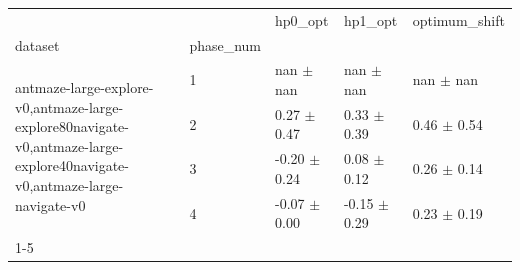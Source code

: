 \begin{tabular}{lllll}
\toprule
 &  & hp0_opt & hp1_opt & optimum_shift \\
dataset & phase_num &  &  &  \\
\midrule
\multirow[t]{4}{*}{antmaze-large-explore-v0,antmaze-large-explore80navigate-v0,antmaze-large-explore40navigate-v0,antmaze-large-navigate-v0} & 1 & nan $\pm$ nan & nan $\pm$ nan & nan $\pm$ nan \\
 & 2 & 0.27 $\pm$ 0.47 & 0.33 $\pm$ 0.39 & 0.46 $\pm$ 0.54 \\
 & 3 & -0.20 $\pm$ 0.24 & 0.08 $\pm$ 0.12 & 0.26 $\pm$ 0.14 \\
 & 4 & -0.07 $\pm$ 0.00 & -0.15 $\pm$ 0.29 & 0.23 $\pm$ 0.19 \\
\cline{1-5}
\bottomrule
\end{tabular}
